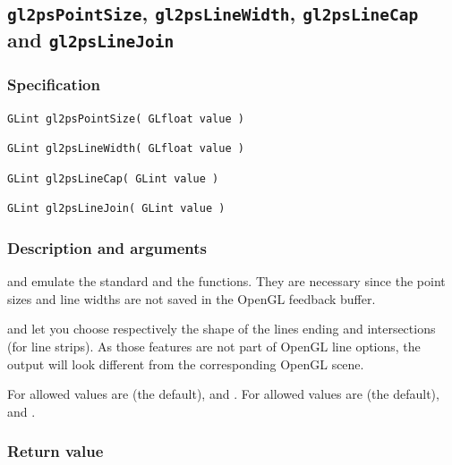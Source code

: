 
\subsection{\texttt{gl2psPointSize}, \texttt{gl2psLineWidth},
  \texttt{gl2psLineCap} and \texttt{gl2psLineJoin}}
\label{sec:gl2psPointSize}

\subsubsection{Specification}

\begin{verbatim}
GLint gl2psPointSize( GLfloat value )
\end{verbatim}

\begin{verbatim}
GLint gl2psLineWidth( GLfloat value )
\end{verbatim}

\begin{verbatim}
GLint gl2psLineCap( GLint value )
\end{verbatim}

\begin{verbatim}
GLint gl2psLineJoin( GLint value )
\end{verbatim}

\subsubsection{Description and arguments}

 and  emulate the standard
 and the  functions. They are necessary
since the point sizes and line widths are not saved in the OpenGL feedback
buffer.

 and  let you choose respectively
the shape of the lines ending and intersections (for line
strips). As those features are not part of OpenGL line options, the
output will look different from the corresponding OpenGL scene.

For  allowed values are 
(the default),  and . For
 allowed values are 
(the default),  and .

\subsubsection{Return value}

